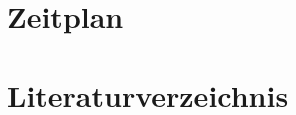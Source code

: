 \documentclass[ngermant]{scrartcl}
\begin{document}
\section{Zeitplan}
\label{sec:Zeitplan}


%



\clearpage

\section{Literaturverzeichnis}
  \vspace*{-8mm}
\renewcommand{\refname}{}
\renewcommand{\thepage}{}
  

\end{document}
